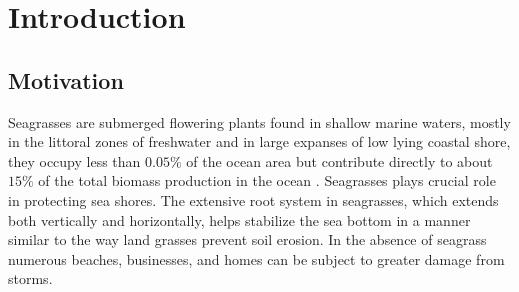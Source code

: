 \documentclass[12pt]{report}   %
\begin{document}
\pagestyle{myheadings}


\chapter{Introduction}
\section{Motivation}
Seagrasses are submerged flowering plants found in shallow marine waters, mostly in the littoral zones of freshwater and in large expanses of low lying coastal shore, they occupy less than $0.05\%$ of the ocean area \cite{green2003world} but contribute directly to about $15\%$ of the total biomass production in the ocean \cite{duarte1999}. Seagrasses plays crucial role in protecting sea shores. The extensive root system in seagrasses, which extends both vertically and horizontally, helps stabilize the sea bottom in a manner similar to the way land grasses prevent soil erosion. In the absence of seagrass numerous beaches, businesses, and homes can be subject to greater damage from storms.
\end{document}
